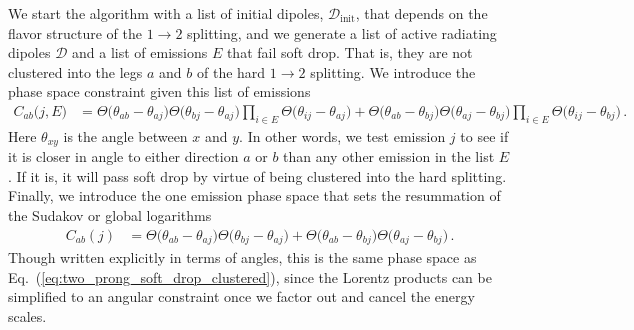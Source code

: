 \documentclass[a4paper,11pt]{article}
\DeclareRobustCommand{\Eq}[1]{Eq.~(\ref{#1})}
\begin{document}
We start the algorithm with a list of initial dipoles, $\mathcal{D}_{\text{init}}$, that depends on the flavor structure of the $1\rightarrow 2$ splitting, and we generate a list of active radiating dipoles $\mathcal{D}$ and a list of emissions $E$ that fail soft drop. That is, they are not clustered into the legs $a$ and $b$ of the hard $1\rightarrow 2$ splitting. We introduce the phase space constraint given this list of emissions
{\small\begin{align}\label{eq:clustering}
C_{ab}\Big(j,E\Big)&=\Theta\Big(\theta_{ab}-\theta_{aj}\Big)\Theta\Big(\theta_{bj}-\theta_{aj}\Big)\prod_{i\in E}\Theta\Big(\theta_{ij}-\theta_{aj}\Big)+\Theta\Big(\theta_{ab}-\theta_{bj}\Big)\Theta\Big(\theta_{aj}-\theta_{bj}\Big)\prod_{i\in E}\Theta\Big(\theta_{ij}-\theta_{bj}\Big)\,.
\end{align}} 
Here $\theta_{xy}$ is the angle between $x$ and $y$. In other words, we test emission $j$ to see if it is closer in angle to either direction $a$ or $b$ than any other emission in the list $E$. If it is, it will pass soft drop by virtue of being clustered into the hard splitting. Finally, we introduce the one emission phase space that sets the resummation of the Sudakov or global logarithms
\begin{align}\label{eq:clustering_one_loop}     
C_{ab}(j)&=\Theta\Big(\theta_{ab}-\theta_{aj}\Big)\Theta\Big(\theta_{bj}-\theta_{aj}\Big)+\Theta\Big(\theta_{ab}-\theta_{bj}\Big)\Theta\Big(\theta_{aj}-\theta_{bj}\Big)\,.
\end{align}
Though written explicitly in terms of angles, this is the same phase space as \Eq{eq:two_prong_soft_drop_clustered}, since the Lorentz products can be simplified to an angular constraint once we factor out and cancel the energy scales. 
\end{document}
